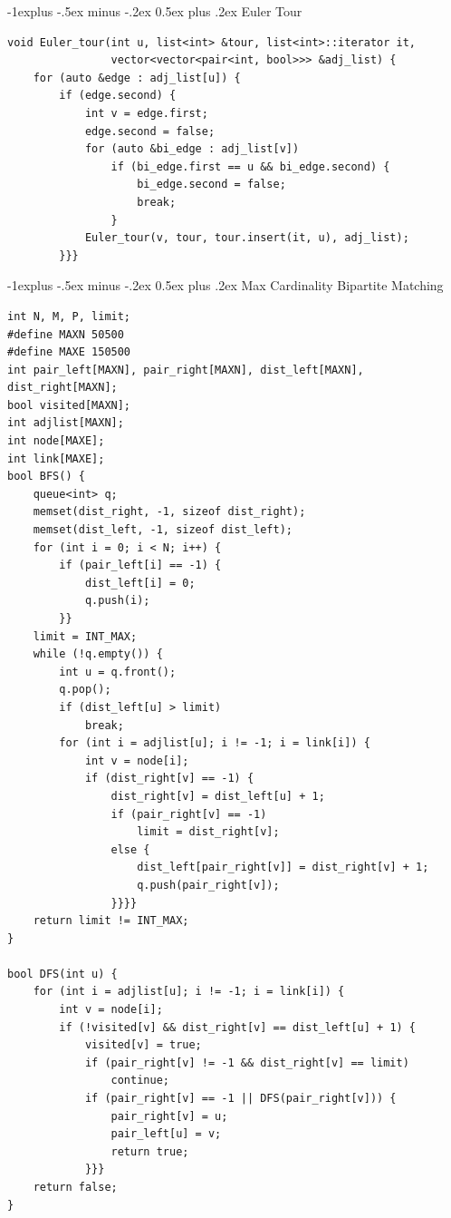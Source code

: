 \documentclass[10pt,landscape]{article}
\makeatletter
\renewcommand{\subsection}{\@startsection{subsection}{2}{0mm}%
                                {-1explus -.5ex minus -.2ex}%
                                {0.5ex plus .2ex}%
                                {\normalfont\normalsize\bfseries}}
\makeatother
\begin{document}
\begin{multicols}{2}
\subsection{Euler Tour}
\begin{lstlisting}
void Euler_tour(int u, list<int> &tour, list<int>::iterator it, 
                vector<vector<pair<int, bool>>> &adj_list) {
    for (auto &edge : adj_list[u]) {
        if (edge.second) {
            int v = edge.first;
            edge.second = false;
            for (auto &bi_edge : adj_list[v]) 
                if (bi_edge.first == u && bi_edge.second) {
                    bi_edge.second = false;
                    break;
                }
            Euler_tour(v, tour, tour.insert(it, u), adj_list);
        }}}
\end{lstlisting}

\subsection{Max Cardinality Bipartite Matching}
\begin{lstlisting}
int N, M, P, limit;
#define MAXN 50500
#define MAXE 150500
int pair_left[MAXN], pair_right[MAXN], dist_left[MAXN], dist_right[MAXN];
bool visited[MAXN];
int adjlist[MAXN];
int node[MAXE];
int link[MAXE];
bool BFS() {
    queue<int> q;
    memset(dist_right, -1, sizeof dist_right);
    memset(dist_left, -1, sizeof dist_left);
    for (int i = 0; i < N; i++) {
        if (pair_left[i] == -1) {
            dist_left[i] = 0;
            q.push(i);
        }}
    limit = INT_MAX;
    while (!q.empty()) {
        int u = q.front();
        q.pop();
        if (dist_left[u] > limit)
            break;
        for (int i = adjlist[u]; i != -1; i = link[i]) {
            int v = node[i];
            if (dist_right[v] == -1) {
                dist_right[v] = dist_left[u] + 1;
                if (pair_right[v] == -1)
                    limit = dist_right[v];
                else {
                    dist_left[pair_right[v]] = dist_right[v] + 1;
                    q.push(pair_right[v]);
                }}}}
    return limit != INT_MAX;
}
 
bool DFS(int u) {
    for (int i = adjlist[u]; i != -1; i = link[i]) {
        int v = node[i];
        if (!visited[v] && dist_right[v] == dist_left[u] + 1) {
            visited[v] = true;
            if (pair_right[v] != -1 && dist_right[v] == limit)
                continue;
            if (pair_right[v] == -1 || DFS(pair_right[v])) {
                pair_right[v] = u;
                pair_left[u] = v;
                return true;
            }}}
    return false;
}
 

\end{lstlisting}
\end{multicols}
\end{document}
